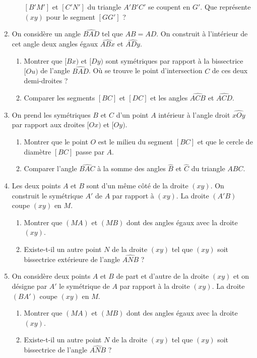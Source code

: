 \begin{enumerate}
\begin{enumerate}
$[B'M']$ et $[C'N']$ du triangle $A'B'C'$ se coupent en $G'$. Que représente $(xy)$
pour le segment $[GG']$ ? 
\end{enumerate}
\item On considère un angle $\widehat{BAD}$ tel que $AB=AD$. On construit à l'intérieur de cet angle deux angles égaux $\widehat{ABx}$ et $\widehat{ADy}$.
\begin{enumerate}
\item Montrer que $[Bx)$ et $[Dy)$ sont symétriques par rapport à la bissectrice $[Ou)$ de l'angle $\widehat{BAD}$. Où se trouve le point d'intersection $C$ de ces
deux demi-droites ? 
\item Comparer les segments $[BC]$ et $[DC]$ et les angles $\widehat{ACB}$ et $\widehat{ACD}$.
\end{enumerate}
\item On prend les symétriques $B$ et $C$ d'un point $A$ intérieur à l'angle droit $\widehat{xOy}$ par rapport aux droites $[Ox)$ et $[Oy)$. \begin{enumerate}
\item Montrer que le point $O$ est le milieu du segment $[BC]$ et que le 
cercle de diamètre $[BC]$ passe par $A$. 
\item Comparer l'angle $\widehat{BAC}$ à la somme des angles $\widehat{B}$ et $\widehat{C}$ du triangle
$ABC$.
\end{enumerate}
\item Les deux points $A$ et $B$ sont d'un même côté de la droite $(xy)$. On construit le symétrique $A'$ de $A$ par rapport à $(xy)$. La droite $(A'B)$ coupe 
$(xy)$ en $M$. \begin{enumerate}
\item Montrer que $(MA)$ et $(MB)$ dont des angles égaux avec la droite $(xy)$.
\item Existe-t-il un autre point $N$ de la droite $(xy)$ tel que $(xy)$ soit
bissectrice extérieure de l'angle $\widehat{ANB}$ ? 
\end{enumerate}
\item On considère deux points $A$ et $B$ de part et d'autre de la droite $(xy)$
et on désigne par $A'$ le symétrique de $A$ par rapport à la droite $(xy)$.
La droite $(BA')$ coupe $(xy)$ en $M$.  \begin{enumerate}
\item Montrer que $(MA)$ et $(MB)$ dont des angles égaux avec la droite $(xy)$.
\item Existe-t-il un autre point $N$ de la droite $(xy)$ tel que $(xy)$ soit
bissectrice de l'angle $\widehat{ANB}$ ? 

\end{enumerate}
\end{enumerate}
